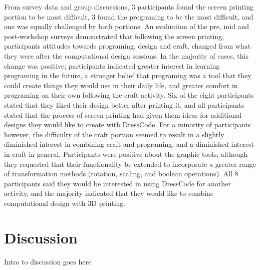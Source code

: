 \documentclass{sigchi}
\begin{document}
From survey data and group discussions, 3 participants found the screen printing portion to be most difficult, 3 found the programing to be the most difficult, and one was equally challenged by both portions. An evaluation of the pre, mid and post-workshop surveys demonstrated that following the screen printing, participants attitudes towards programing, design and craft, changed from what they were after the computational design sessions. In the majority of cases, this change was positive; participants indicated greater interest in learning programing in the future, a stronger belief that programing was a tool that they could create things they would use in their daily life, and greater comfort in programing on their own following the craft activity. Six of the eight participants stated that they liked their design better after printing it, and all participants stated that the process of screen printing had given them ideas for additional designs they would like to create with DressCode. For a minority of participants however, the difficulty of the craft portion seemed to result in a slightly diminished interest in combining craft and programing, and a diminished interest in craft in general. Participants were positive about the graphic tools, although they requested that their functionality be extended to incorporate a greater range of transformation methods (rotation, scaling, and boolean operations). All 8 participants said they would be interested in using DressCode for another activity, and the majority indicated that they would like to combine computational design with 3D printing.

\section{Discussion}
Intro to discussion goes here
\end{document}
